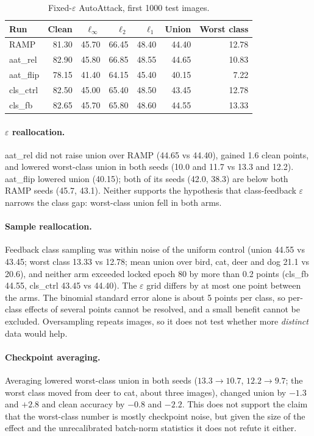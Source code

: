 \documentclass[11pt]{article}
\begin{document}
\begin{table}[h]\centering\caption{Fixed-$\varepsilon$ AutoAttack, first 1000 test images.}
\begin{tabular}{lrrrrrr}\toprule
Run & Clean & $\ell_\infty$ & $\ell_2$ & $\ell_1$ & Union & Worst class \\\midrule
RAMP & 81.30 & 45.70 & 66.45 & 48.40 & 44.40 & 12.78 \\
aat\_rel & 82.90 & 45.80 & 66.85 & 48.55 & 44.65 & 10.83 \\
aat\_flip & 78.15 & 41.40 & 64.15 & 45.40 & 40.15 & 7.22 \\
cls\_ctrl & 82.50 & 45.00 & 65.40 & 48.50 & 43.45 & 12.78 \\
cls\_fb & 82.65 & 45.70 & 65.80 & 48.60 & 44.55 & 13.33 \\
\bottomrule\end{tabular}
\end{table}

\paragraph{$\varepsilon$ reallocation.} aat\_rel did not raise union over RAMP (44.65 vs 44.40), gained 1.6 clean points,
and lowered worst-class union in both seeds (10.0 and 11.7 vs 13.3 and 12.2). aat\_flip lowered union (40.15); both of its
seeds (42.0, 38.3) are below both RAMP seeds (45.7, 43.1). Neither supports the hypothesis that class-feedback
$\varepsilon$ narrows the class gap: worst-class union fell in both arms.

\paragraph{Sample reallocation.} Feedback class sampling was within noise of the uniform control (union 44.55 vs 43.45;
worst class 13.33 vs 12.78; mean union over bird, cat, deer and dog 21.1 vs 20.6), and neither arm exceeded locked epoch 80
by more than 0.2 points (cls\_fb 44.55, cls\_ctrl 43.45 vs 44.40). The $\varepsilon$ grid differs by at most one point between
the arms. The binomial standard error alone is about 5 points per class, so per-class effects of several points cannot be resolved, and a small benefit cannot be excluded.
Oversampling repeats images, so it does not test whether more \emph{distinct} data would help.

\paragraph{Checkpoint averaging.} Averaging lowered worst-class union in both seeds ($13.3\to10.7$, $12.2\to9.7$; the worst
class moved from deer to cat, about three images), changed union by $-1.3$ and $+2.8$ and clean accuracy by $-0.8$ and
$-2.2$. This does not support the claim that the worst-class number is mostly checkpoint noise, but given the size of the
effect and the unrecalibrated batch-norm statistics it does not refute it either.
\end{document}
